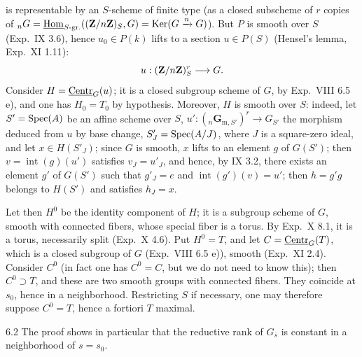 is representable by an $S$-scheme of finite type (as a closed subscheme of $r$ copies of ${}_nG=\underline{\operatorname{Hom}}_{S\text{-gr.}}((\mathbf{Z}/n\mathbf{Z})_S,G)=\operatorname{Ker}(G\xrightarrow{n}G)$). But $P$ is smooth over $S$ (Exp.~IX 3.6), hence $u_0\in P(k)$ lifts to a section $u\in P(S)$ (Hensel's lemma, Exp.~XI 1.11):
\[
u:(\mathbf{Z}/n\mathbf{Z})_S^r\longrightarrow G.
\]
Consider $H=\underline{\mathrm{Centr}}_G(u)$; it is a closed subgroup scheme of $G$, by Exp.~VIII 6.5 e), and one has $H_0=T_0$ by hypothesis.{\renewcommand{\thefootnote}{(45)}} Moreover, $H$ is smooth over $S$: indeed, let $S'=\operatorname{Spec}(A)$ be an affine scheme over $S$, $u':({}_n\mathbf{G}_{\mathrm m,S'})^r\to G_{S'}$ the morphism deduced from $u$ by base change, $S'_J=\operatorname{Spec}(A/J)$, where $J$ is a square-zero ideal, and let $x\in H(S'_J)$; since $G$ is smooth, $x$ lifts to an element $g$ of $G(S')$; then $v=\operatorname{int}(g)(u')$ satisfies $v_J=u'_J$, and hence, by IX 3.2, there exists an element $g'$ of $G(S')$ such that $g'_J=e$ and $\operatorname{int}(g')(v)=u'$; then $h=g'g$ belongs to $H(S')$ and satisfies $h_J=x$.

Let then $H^0$ be the identity component of $H$; it is a subgroup scheme of $G$, smooth with connected fibers, whose special fiber is a torus. By Exp.~X 8.1, it is a torus, necessarily split (Exp.~X 4.6). Put $H^0=T$, and let $C=\underline{\mathrm{Centr}}_G(T)$, which is a closed subgroup of $G$ (Exp.~VIII 6.5 e)), smooth (Exp.~XI 2.4). Consider $C^0$ (in fact one has $C^0=C$, but we do not need to know this); then $C^0\supset T$, and these are two smooth groups with connected fibers. They coincide at $s_0$, hence in a neighborhood. Restricting $S$ if necessary, one may therefore suppose $C^0=T$, hence a fortiori $T$ maximal.

\begin{remark}{6.2}\label{XIX.6.2}
The proof shows in particular that the reductive rank of $G_{\overline{s}}$ is constant in a neighborhood of $s=s_0$.
\end{remark}

